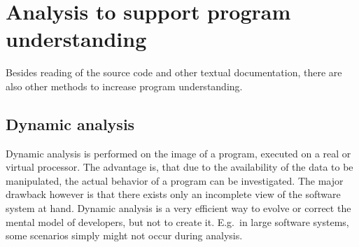 \section{Analysis to support program understanding}

Besides reading of the source code and other textual documentation, there are also other methods to increase program understanding.

\subsection{Dynamic analysis}

Dynamic analysis is performed on the image of a program, executed on a real or virtual processor. The advantage is, that due to the availability of the data to be manipulated, the actual behavior of a program can be investigated. The major drawback however is that there exists only an incomplete view of the software system at hand\cite{Ball:1999:CDA:318774.318944}. Dynamic analysis is a very efficient way to evolve or correct the mental model of developers, but not to create it. E.g.\ in large software systems, some scenarios simply might not occur during analysis.

